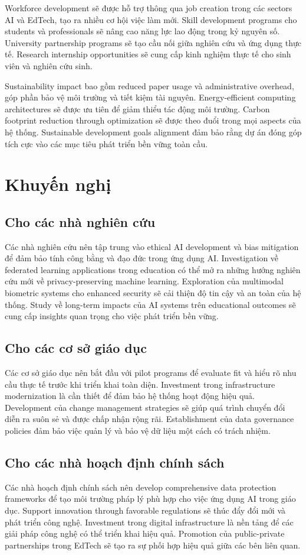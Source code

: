 \documentclass[12pt,a4paper]{report}
\begin{document}
Workforce development sẽ được hỗ trợ thông qua job creation trong các sectors AI và EdTech, tạo ra nhiều cơ hội việc làm mới. Skill development programs cho students và professionals sẽ nâng cao năng lực lao động trong kỷ nguyên số. University partnership programs sẽ tạo cầu nối giữa nghiên cứu và ứng dụng thực tế. Research internship opportunities sẽ cung cấp kinh nghiệm thực tế cho sinh viên và nghiên cứu sinh.

Sustainability impact bao gồm reduced paper usage và administrative overhead, góp phần bảo vệ môi trường và tiết kiệm tài nguyên. Energy-efficient computing architectures sẽ được ưu tiên để giảm thiểu tác động môi trường. Carbon footprint reduction through optimization sẽ được theo đuổi trong mọi aspects của hệ thống. Sustainable development goals alignment đảm bảo rằng dự án đóng góp tích cực vào các mục tiêu phát triển bền vững toàn cầu.

\section{Khuyến nghị}
\subsection{Cho các nhà nghiên cứu}
Các nhà nghiên cứu nên tập trung vào ethical AI development và bias mitigation để đảm bảo tính công bằng và đạo đức trong ứng dụng AI. Investigation về federated learning applications trong education có thể mở ra những hướng nghiên cứu mới về privacy-preserving machine learning. Exploration của multimodal biometric systems cho enhanced security sẽ cải thiện độ tin cậy và an toàn của hệ thống. Study về long-term impacts của AI systems trên educational outcomes sẽ cung cấp insights quan trọng cho việc phát triển bền vững.

\subsection{Cho các cơ sở giáo dục}
Các cơ sở giáo dục nên bắt đầu với pilot programs để evaluate fit và hiểu rõ nhu cầu thực tế trước khi triển khai toàn diện. Investment trong infrastructure modernization là cần thiết để đảm bảo hệ thống hoạt động hiệu quả. Development của change management strategies sẽ giúp quá trình chuyển đổi diễn ra suôn sẻ và được chấp nhận rộng rãi. Establishment của data governance policies đảm bảo việc quản lý và bảo vệ dữ liệu một cách có trách nhiệm.

\subsection{Cho các nhà hoạch định chính sách}
Các nhà hoạch định chính sách nên develop comprehensive data protection frameworks để tạo môi trường pháp lý phù hợp cho việc ứng dụng AI trong giáo dục. Support innovation through favorable regulations sẽ thúc đẩy đổi mới và phát triển công nghệ. Investment trong digital infrastructure là nền tảng để các giải pháp công nghệ có thể triển khai hiệu quả. Promotion của public-private partnerships trong EdTech sẽ tạo ra sự phối hợp hiệu quả giữa các bên liên quan.
\end{document}
